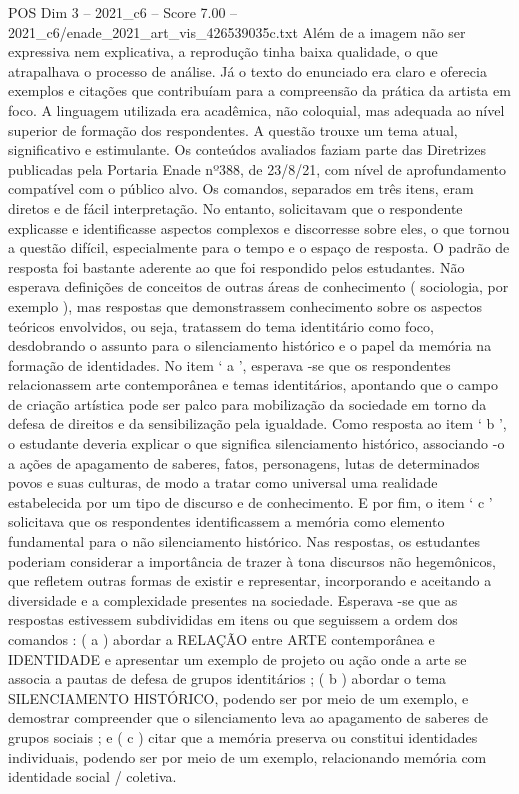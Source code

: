 \begin{textsample}{POS Dim 3 – 2021\_c6 – Score 7.00 – 2021\_c6/enade\_2021\_art\_vis\_426539035c.txt}
Além de a imagem não ser expressiva nem explicativa, a reprodução tinha baixa qualidade, o que atrapalhava o processo de análise.
Já o texto do enunciado era claro e oferecia exemplos e citações que contribuíam para a compreensão da prática da artista em foco.
A linguagem utilizada era acadêmica, não coloquial, mas adequada ao nível superior de formação dos respondentes.
A questão trouxe um tema atual, significativo e estimulante.
Os conteúdos avaliados faziam parte das Diretrizes publicadas pela Portaria Enade nº388, de 23/8/21, com nível de aprofundamento compatível com o público alvo.
Os comandos, separados em três itens, eram diretos e de fácil interpretação.
No entanto, solicitavam que o respondente explicasse e identificasse aspectos complexos e discorresse sobre eles, o que tornou a questão difícil, especialmente para o tempo e o espaço de resposta.
O padrão de resposta foi bastante aderente ao que foi respondido pelos estudantes.
Não esperava definições de conceitos de outras áreas de conhecimento ( sociologia, por exemplo ), mas respostas que demonstrassem conhecimento sobre os aspectos teóricos envolvidos, ou seja, tratassem do tema identitário como foco, desdobrando o assunto para o silenciamento histórico e o papel da memória na formação de identidades.
No item ‘ a ’, esperava -se que os respondentes relacionassem arte contemporânea e temas identitários, apontando que o campo de criação artística pode ser palco para mobilização da sociedade em torno da defesa de direitos e da sensibilização pela igualdade.
Como resposta ao item ‘ b ’, o estudante deveria explicar o que significa silenciamento histórico, associando -o a ações de apagamento de saberes, fatos, personagens, lutas de determinados povos e suas culturas, de modo a tratar como universal uma realidade estabelecida por um tipo de discurso e de conhecimento.
E por fim, o item ‘ c ’ solicitava que os respondentes identificassem a memória como elemento fundamental para o não silenciamento histórico.
Nas respostas, os estudantes poderiam considerar a importância de trazer à tona discursos não hegemônicos, que refletem outras formas de existir e representar, incorporando e aceitando a diversidade e a complexidade presentes na sociedade.
Esperava -se que as respostas estivessem subdivididas em itens ou que seguissem a ordem dos comandos : ( a ) abordar a RELAÇÃO entre ARTE contemporânea e IDENTIDADE e apresentar um exemplo de projeto ou ação onde a arte se associa a pautas de defesa de grupos identitários ; ( b ) abordar o tema SILENCIAMENTO HISTÓRICO, podendo ser por meio de um exemplo, e demostrar compreender que o silenciamento leva ao apagamento de saberes de grupos sociais ; e ( c ) citar que a memória preserva ou constitui identidades individuais, podendo ser por meio de um exemplo, relacionando memória com identidade social / coletiva.

\end{textsample}
